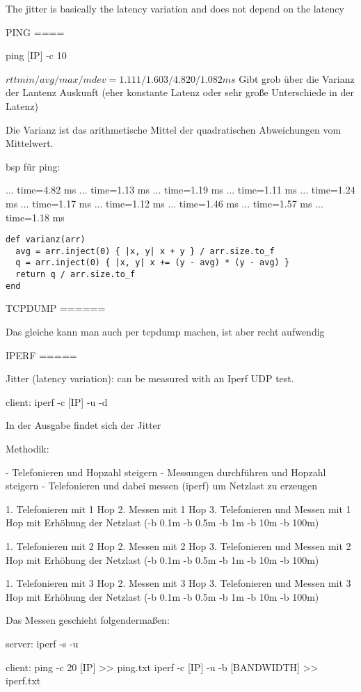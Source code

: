 \documentclass[a4paper,10pt]{article}
\begin{document}
The jitter is basically the latency variation and does not depend on the latency

PING
====

ping [IP] -c 10

$rtt min/avg/max/mdev = 1.111/1.603/4.820/1.082 ms$ Gibt grob über die Varianz der Lantenz Auskunft (eher konstante Latenz oder sehr große Unterschiede in der Latenz)

Die Varianz ist das arithmetische Mittel der quadratischen Abweichungen vom Mittelwert.

bsp für ping:

... time=4.82 ms
... time=1.13 ms
... time=1.19 ms
... time=1.11 ms
... time=1.24 ms
... time=1.17 ms
... time=1.12 ms
... time=1.46 ms
... time=1.57 ms
... time=1.18 ms

\begin{lstlisting}
def varianz(arr)
  avg = arr.inject(0) { |x, y| x + y } / arr.size.to_f
  q = arr.inject(0) { |x, y| x += (y - avg) * (y - avg) }
  return q / arr.size.to_f
end
\end{lstlisting}

TCPDUMP
======

Das gleiche kann man auch per tcpdump machen, ist aber recht aufwendig

IPERF
=====

Jitter (latency variation): can be measured with an Iperf UDP test.

client: iperf -c [IP] -u -d

In der Ausgabe findet sich der Jitter

Methodik:

- Telefonieren und Hopzahl steigern
- Messungen durchführen und Hopzahl steigern
- Telefonieren und dabei messen (iperf) um Netzlast zu erzeugen

1. Telefonieren mit 1 Hop
2. Messen mit 1 Hop
3. Telefonieren und Messen mit 1 Hop mit Erhöhung der Netzlast (-b 0.1m -b 0.5m -b 1m -b 10m -b 100m)

1. Telefonieren mit 2 Hop
2. Messen mit 2 Hop
3. Telefonieren und Messen mit 2 Hop mit Erhöhung der Netzlast (-b 0.1m -b 0.5m -b 1m -b 10m -b 100m)

1. Telefonieren mit 3 Hop
2. Messen mit 3 Hop
3. Telefonieren und Messen mit 3 Hop mit Erhöhung der Netzlast (-b 0.1m -b 0.5m -b 1m -b 10m -b 100m)

Das Messen geschieht folgendermaßen:

server:
iperf -s -u

client:
ping -c 20 [IP] >> ping.txt
iperf -c [IP] -u -b [BANDWIDTH] >> iperf.txt
\end{document}
